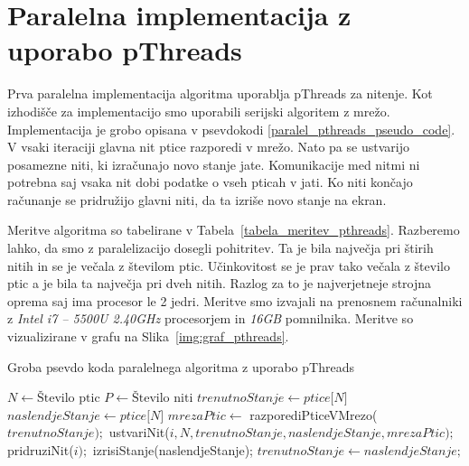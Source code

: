 \documentclass[a4paper, 12pt]{book}
\begin{document}
\chapter{Paralelna implementacija z uporabo pThreads}
\label{ch2}
Prva paralelna implementacija algoritma uporablja pThreads za nitenje. Kot izhodišče za implementacijo smo uporabili serijski algoritem z mrežo. Implementacija je grobo opisana v psevdokodi \ref{paralel_pthreads_pseudo_code}. V vsaki iteraciji glavna nit ptice razporedi v mrežo. Nato pa se ustvarijo posamezne niti, ki izračunajo novo stanje jate. Komunikacije med nitmi ni potrebna saj vsaka nit dobi podatke o vseh pticah v jati. Ko niti končajo računanje se pridružijo glavni niti, da ta izriše novo stanje na ekran.

Meritve algoritma so tabelirane v Tabela~\ref{tabela_meritev_pthreads}. Razberemo lahko, da smo z paralelizacijo dosegli pohitritev. Ta je bila največja pri štirih nitih in se je večala z številom ptic. Učinkovitost se je prav tako večala z število ptic a je bila ta največja pri dveh nitih. Razlog za to je najverjetneje strojna oprema saj ima procesor le 2 jedri. Meritve smo izvajali na prenosnem računalniki z \textit{Intel i7 – 5500U 2.40GHz} procesorjem in \textit{16GB} pomnilnika. Meritve so vizualizirane v grafu na Slika~\ref{img:graf_pthreads}.

\begin{algorithm}
\caption{Groba psevdo koda paralelnega algoritma z uporabo pThreads}\label{paralel_pthreads_pseudo_code}
\begin{algorithmic}[1]
\State $N \gets \text{Število ptic}$
\State $P \gets \text{Število niti}$
\State $trenutnoStanje \gets \textit{ptice[N]}$
\State $naslendjeStanje \gets \textit{ptice[N]}$
\Loop
\State $mrezaPtic \gets$ razporediPticeVMrezo($trenutnoStanje);$
\State ustvariNit($i, N, trenutnoStanje, naslendjeStanje, mrezaPtic);$
\EndFor
{}
\State pridruziNit($i);$
\EndFor
\State izrisiStanje(naslendjeStanje);
\State $trenutnoStanje \gets naslendjeStanje;$
\EndLoop
\end{algorithmic}
\end{algorithm}
\end{document}
